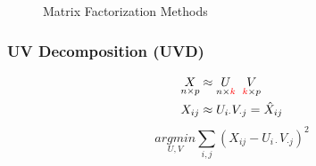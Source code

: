 \documentclass[xcolor={dvipsnames}]{beamer}
\begin{document}
\frame
{
\Huge

\begin{figure}
Matrix Factorization Methods
\end{figure}
}

\frame
{
\frametitle{UV Decomposition (UVD)}

\color{Maroon}
\vspace{-3em}
\LARGE
\begin{align*} 
\underset{n\times p}{X} \approx{}& \underset{n\times \textcolor{red}{k}}{U}\;\;\underset{\textcolor{red}{k}\times p}{V}\\
X_{ij} \approx{}& U_{i \cdot}V_{\cdot j} = \hat X_{ij}
\end{align*}
$$\underset{U,V}{argmin} \sum_{i,j} (X_{ij} - {U_{i\cdot}}{V_{\cdot j}})^2$$

\vspace{.5em}
\normalsize 

\color{Black}

}
\end{document}
